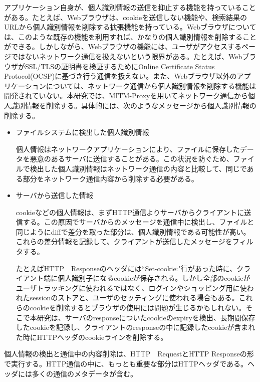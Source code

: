 \documentclass[submit,techrep]{ipsj}
\begin{document}
アプリケーション自身が、個人識別情報の送信を抑止する機能を持っていることがある。たとえば、Webブラウザは、cookieを送信しない機能や、検索結果のURLから個人識別情報を削除する拡張機能を持っている。Webブラウザについては、このような既存の機能を利用すれば、かなりの個人識別情報を削除することができる。しかしながら、Webブラウザの機能には、ユーザがアクセスするページではないネットワーク通信を扱えないという限界がある。たとえば、WebブラウザがSSL/TLSの証明書を検証するためにOnline Certificate Status Protocol(OCSP)に基づき行う通信を扱えない。また、Webブラウザ以外のアプリケーションについては、ネットワーク通信から個人識別情報を削除する機能は開発されていない。本研究では、MITM-Proxyを用いてネットワーク通信から個人識別情報を削除する。具体的には、次のようなメッセージから個人識別情報の削除する。
\begin{itemize}

\item
ファイルシステムに検出した個人識別情報

個人情報はネットワークアプリケーションにより、ファイルに保存したデータを悪意のあるサーバに送信することがある。この状況を防ぐため、ファイルで検出した個人識別情報はネットワーク通信の内容と比較して、同じである部分をネットワーク通信内容から削除する必要がある。


\item
サーバから送信した情報

cookieなどの個人情報は、まずHTTP通信よりサーバからクライアントに送信する。この原因でサーバからのメッセージを通信中に検出し、ファイルと同じようにdiffで差分を取った部分は、個人識別情報である可能性が高い。これらの差分情報を記録して、クライアントが送信したメッセージをフィルタする。

たとえばHTTP　Responseのヘッダには``Set-cookie:"行があった時に、クライアント端に個人識別子になるcookieが保存される。しかし全部のcookieがユーザトラッキングに使われるではなく、ログインやショッピング用に使われたsessionのストアと、ユーザのセッティングに使われる場合もある。これらのcookieを削除するとブラウザの使用には問題が生じるかもしれない。そこで本研究は、サーバのresponseについたcookieのexpiryを検出、長期間保存したcookieを記録し、クライアントのresponseの中に記録したcookieが含まれた時にHTTPヘッダのcookieラインを削除する。

\end{itemize}

個人情報の検出と通信中の内容削除は、HTTP　RequestとHTTP Responseの形で実行する。HTTP通信の中に、もっとも重要な部分はHTTPヘッダである。ヘッダには多くの通信のメタデータが含む。
\end{document}
